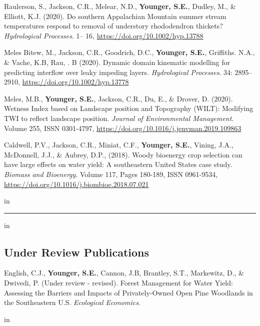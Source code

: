\documentclass[10pt,letterpaper]{article}
\begin{document}
\begin{hangparas}{.25in}{1}
		Raulerson, S., Jackson, C.R., Melear, N.D., \textbf{Younger, S.E.}, Dudley, M., \& Elliott, K.J. (2020). Do southern Appalachian Mountain summer stream temperatures respond to removal of understory rhododendron thickets? \textit{Hydrological Processes}. 1– 16, \url{https://doi.org/10.1002/hyp.13788}
		
		Meles Bitew, M., Jackson, C.R., Goodrich, D.C., \textbf{Younger, S.E.}, Griffiths. N.A., \& Vache, K.B, Rau, . B (2020). Dynamic domain kinematic modelling for predicting interflow over leaky impeding layers. \textit{Hydrological Processes}. 34: 2895– 2910, \url{https://doi.org/10.1002/hyp.13778}
		
		Meles, M.B., \textbf{Younger, S.E.}, Jackson, C.R., Du, E., \& Drover, D. (2020). Wetness Index based on Landscape position and Topography (WILT): Modifying TWI to reflect landscape position. \textit{Journal of Environmental Management}. Volume 255, ISSN 0301-4797, \url{https://doi.org/10.1016/j.jenvman.2019.109863}
		
		Caldwell, P.V., Jackson, C.R., Miniat, C.F., \textbf{Younger, S.E.}, Vining, J.A., McDonnell, J.J., \& Aubrey, D.P., (2018). Woody bioenergy crop selection can have large effects on water yield: A southeastern United States case study.
		\textit{Biomass and Bioenergy}. Volume 117, Pages 180-189, ISSN 0961-9534, \url{https://doi.org/10.1016/j.biombioe.2018.07.021}
		
		 in
		\vspace{-0.4em}
		
	\end{hangparas}

\newpage

\hrule
\vspace{-0.4em}
 in
\subsection*{Under Review Publications}

\begin{hangparas}{.25in}{1}
	
	English, C.J., \textbf{Younger, S.E.}, Cannon, J.B, Brantley, S.T., Markewitz, D., \& Dwivedi, P. (Under review - revised). Forest Management for Water Yield: Assessing the Barriers and Impacts of Privately-Owned Open Pine Woodlands in the Southeastern U.S. \textit{Ecological Economics}.
	
	 in
	\vspace{-0.4em}
	
\end{hangparas}
	
\end{document}
